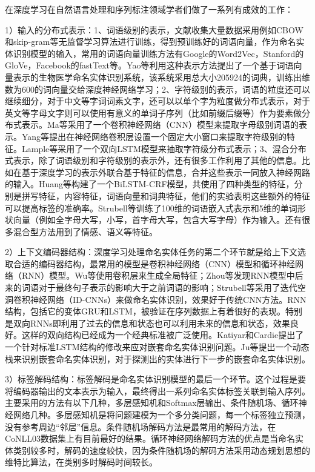 \documentclass[winfonts,master,oneside,nobackinfo]{njuthesis}
\begin{document}
在深度学习在自然语言处理和序列标注领域学者们做了一系列有成效的工作：

1）输入的分布式表示：1、词语级别的表示，文献\cite{Nguyen}收集大量数据采用例如CBOW和skip-gram等无监督学习算法进行训练，得到预训练好的词语向量，作为命名实体识别模型的输入，常用的词语向量训练方法有Google的Word2Vec，Stanford的GloVe，Facebook的fastText等。Yao等\cite{Yao}利用这种表示方法提出了一个基于词语向量表示的生物医学命名实体识别系统，该系统采用总大小205924的词典，训练出维数为600的词向量交给深度神经网络学习；2、字符级别的表示，词语的粒度还可以继续细分\cite{Kuru}，对于中文等字词词素文字，还可以以单个字为粒度做分布式表示，对于英文等字母文字则可以使用有意义的单词子序列（比如前缀后缀等）作为要素做分布式表示。Ma等\cite{Ma}采用了一个卷积神经网络（CNN）模型来提取字母级别词语的表示。Yang等\cite{Yang}提出在神经网络卷积层设置一个固定大小窗口来提取字符级别的特征。Lample等\cite{Lample}采用了一个双向LSTM模型来抽取字符级分布式表示；3、混合分布式表示，除了词语级别和字符级别的表示外，还有很多工作利用了其他的信息。比如在基于深度学习的表示外联合基于特征的信息，合并这些表示一同放入神经网路的输入。Huang等\cite{Huang}构建了一个BiLSTM-CRF模型，共使用了四种类型的特征，分别是拼写特征，内容特征，词语向量和词典特征，他们的实验表明这些额外的特征可以提高标签的准确率。Strubell等\cite{Strubell}训练了100维的词语嵌入式表示和5维的单词形状向量（例如全字母大写，小写，首字母大写，包含大写字母）作为输入。还有很多混合型方法用到了情感、语义\cite{Jansson}等特征。

2）上下文编码器结构：深度学习处理命名实体任务的第二个环节就是给上下文选取合适的编码器结构，最常用的模型是卷积神经网络（CNN）模型和循环神经网络（RNN）模型。Wu等\cite{Wu}使用卷积层来生成全局特征；Zhou等\cite{zhou}发现RNN模型中后来的词语对于最终句子表示的影响大于之前词语的影响；Strubell等\cite{Strubell}采用了迭代空洞卷积神经网络（ID-CNNs）来做命名实体识别，效果好于传统CNN方法。RNN结构，包括它的变体GRU和LSTM，被验证在序列数据上有着很好的表现。特别是双向RNNs\cite{Huang}即利用了过去的信息和状态也可以利用未来的信息和状态，效果良好。这样的双向结构已经成为一个经典标准被广泛使用。Katiyar和Cardie\cite{Katiyar}提出了一个针对标准LSTM结构的修改来应对嵌套命名实体识别问题。Ju等\cite{Ju}提出一个动态栈来识别嵌套命名实体识别，对于探测出的实体进行下一步的嵌套命名实体识别。

3）标签解码结构：标签解码是命名实体识别模型的最后一个环节。这个过程是要将编码器输出的文本表示为输入，最终得出一系列命名实体标签关联到输入序列。主要采用的方法有以下几种，多层感知机和Softmax层输出\cite{Strubell}、条件随机场\cite{Huang}、循环神经网络\cite{Shen}几种。多层感知机是将问题建模为一个多分类问题，每一个标签独立预测，没有参考周边“邻居”信息。条件随机场解码方法是最常用的解码方法，在CoNLL03数据集上有目前最好的结果\cite{Akbik}。循环神经网络解码方法的优点是当命名实体类别较多时，解码的速度较快\cite{Shen}，因为条件随机场的解码方法采用动态规划思想的维特比算法，在类别多时解码时间较长。
\end{document}
